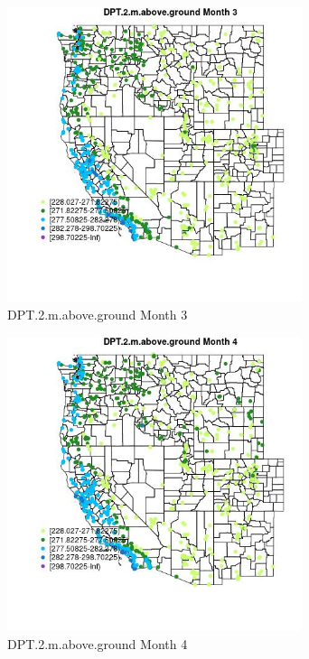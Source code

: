 \begin{figure} 
\centering  
\includegraphics[width=0.77\textwidth]{Code_Outputs/Report_ML_input_PM25_Step4_part_f_de_duplicated_aveswNAs_MapObsMo3DPT2maboveground.jpg} 
\caption{\label{fig:Report_ML_input_PM25_Step4_part_f_de_duplicated_aveswNAsMapObsMo3DPT2maboveground}DPT.2.m.above.ground Month 3} 
\end{figure} 
 

\clearpage 

\begin{figure} 
\centering  
\includegraphics[width=0.77\textwidth]{Code_Outputs/Report_ML_input_PM25_Step4_part_f_de_duplicated_aveswNAs_MapObsMo4DPT2maboveground.jpg} 
\caption{\label{fig:Report_ML_input_PM25_Step4_part_f_de_duplicated_aveswNAsMapObsMo4DPT2maboveground}DPT.2.m.above.ground Month 4} 
\end{figure} 
 

